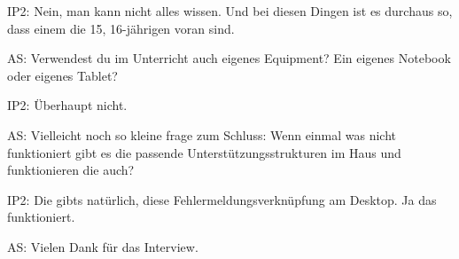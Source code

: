 \documentclass[fontsize=11pt,paper=a4]{scrbook}
\begin{document}
{\begin{itemize*}
\item[IP2:] Nein, man kann nicht alles wissen. Und bei diesen Dingen ist es durchaus so, dass einem die 15, 16-jährigen voran sind.
\item[AS:] Verwendest du im Unterricht auch eigenes Equipment? Ein eigenes Notebook
oder eigenes Tablet?
\item[IP2:] Überhaupt nicht.
\item[AS:] Vielleicht noch so kleine frage
zum Schluss: Wenn einmal was nicht
funktioniert gibt es die passende
Unterstützungsstrukturen im Haus und
funktionieren die auch?
\item[IP2:] Die gibts natürlich, diese Fehlermeldungsverknüpfung am Desktop. Ja das funktioniert.
\item[AS:] Vielen Dank für das Interview.
\end{itemize*} 
}
\newpage
\end{document}
